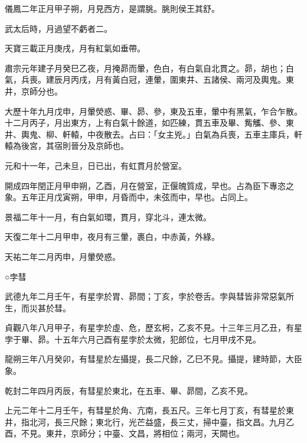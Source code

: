 \begin{pinyinscope}
 儀鳳二年正月甲子朔，月見西方，是謂朓。朓則侯王其舒。



 武太后時，月過望不虧者二。



 天寶三載正月庚戌，月有紅氣如垂帶。



 肅宗元年建子月癸巳乙夜，月掩昴而暈，色白，有白氣自北貫之。昴，胡也；白氣，兵喪。建辰月丙戌，月有黃白冠，連暈，圍東井、五諸侯、兩河及輿鬼。東井，京師分也。



 大歷十年九月戊申，月暈熒惑、畢、昴、參，東及五車，暈中有黑氣，乍合乍散。十二月丙子，月出東方，上有白氣十餘道，如匹練，貫五車及畢、觜觿、參、東井、輿鬼、柳、軒轅，中夜散去。占曰：「女主兇。」白氣為兵喪，五車主庫兵，軒轅為後宮，其宿則晉分及京師也。



 元和十一年，己未旦，日已出，有虹貫月於營室。



 開成四年閏正月甲申朔，乙酉，月在營室，正偃魄質成，早也。占為臣下專恣之象。五年正月戊寅朔，甲申，月昏而中，未弦而中，早也。占同上。



 景福二年十一月，有白氣如環，貫月，穿北斗，連太微。



 天復二年十二月甲申，夜月有三暈，裹白，中赤黃，外綠。



 天祐二年二月丙申，月暈熒惑。



 ○孛彗



 武德九年二月壬午，有星孛於胃、昴間；丁亥，孛於卷舌。孛與彗皆非常惡氣所生，而災甚於彗。



 貞觀八年八月甲子，有星孛於虛、危，歷玄枵，乙亥不見。十三年三月乙丑，有星孛于畢、昴。十五年六月己酉有星孛於太微，犯郎位，七月甲戌不見。



 龍朔三年八月癸卯，有彗星於左攝提，長二尺餘，乙巳不見。攝提，建時節，大臣象。



 乾封二年四月丙辰，有彗星於東北，在五車、畢、昴間，乙亥不見。



 上元二年十二月壬午，有彗星於角、亢南，長五尺。三年七月丁亥，有彗星於東井，指北河，長三尺餘；東北行，光芒益盛，長三丈，掃中臺，指文昌。九月乙酉，不見。東井，京師分；中臺、文昌，將相位；兩河，天闕也。




\end{pinyinscope}
